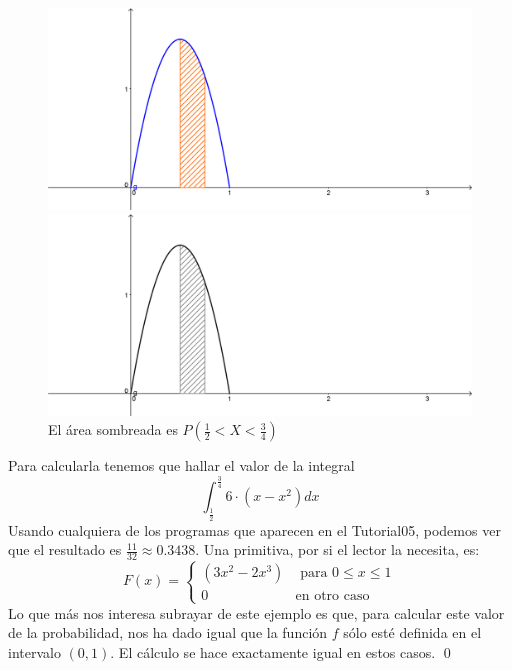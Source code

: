 \begin{ejemplo}
\begin{figure}[htbp]
\begin{center}
\begin{enColor}
\includegraphics[width=12cm]{../fig/Cap05-InterpretacionFuncionDensidadSoporteFinito-2.png}
\end{enColor}
\begin{bn}
\includegraphics[width=12cm]{../fig/Cap05-InterpretacionFuncionDensidadSoporteFinito-2-bn.png}
\end{bn}
\caption{El área sombreada es $P\left(\frac{1}{2}<X<\frac{3}{4}\right)$}
\label{cap05:fig:InterpretacionFuncionDensidadSoporteFinito2}
\end{center}
\end{figure}

    Para calcularla tenemos que hallar el valor de la integral
    \[
    \int_{\frac{1}{2}}^{\frac{3}{4}} 6\cdot(x-x^2) dx
    \]
    Usando cualquiera de los programas que aparecen en el Tutorial05, podemos ver que el resultado es $\frac{11}{32}\approx 0.3438$. Una primitiva, por si el lector la necesita, es:
    \[F(x)=\begin{cases}(3 x^2-2 x^3)&\mbox{ para }0\leq x\leq 1\\ 0&\mbox{en otro caso}\end{cases}\]
    Lo que más nos interesa subrayar de este ejemplo es que, para calcular este valor de la probabilidad, nos ha dado igual que la función $f$ sólo esté definida en el intervalo $(0,1)$. El cálculo se hace exactamente igual en estos casos. \qed
\end{ejemplo}


